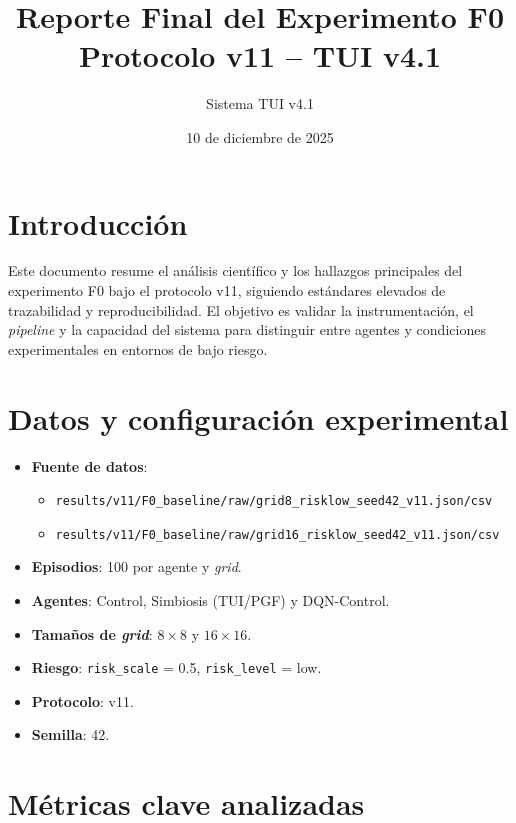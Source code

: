 \documentclass[11pt]{article}
\title{Reporte Final del Experimento F0\\[4pt]\large Protocolo v11 -- TUI v4.1}
\author{Sistema TUI v4.1}
\date{10 de diciembre de 2025}
\begin{document}
\maketitle

\section{Introducción}

Este documento resume el análisis científico y los hallazgos principales del experimento F0 bajo el protocolo v11, siguiendo estándares elevados de trazabilidad y reproducibilidad. El objetivo es validar la instrumentación, el \emph{pipeline} y la capacidad del sistema para distinguir entre agentes y condiciones experimentales en entornos de bajo riesgo.

\section{Datos y configuración experimental}

\begin{itemize}
  \item \textbf{Fuente de datos}:
    \begin{itemize}
      \item \texttt{results/v11/F0\_baseline/raw/grid8\_risklow\_seed42\_v11.json/csv}
      \item \texttt{results/v11/F0\_baseline/raw/grid16\_risklow\_seed42\_v11.json/csv}
    \end{itemize}
  \item \textbf{Episodios}: 100 por agente y \emph{grid}.
  \item \textbf{Agentes}: Control, Simbiosis (TUI/PGF) y DQN-Control.
  \item \textbf{Tamaños de \emph{grid}}: $8\times 8$ y $16\times 16$.
  \item \textbf{Riesgo}: \texttt{risk\_scale} = 0.5, \texttt{risk\_level} = low.
  \item \textbf{Protocolo}: v11.
  \item \textbf{Semilla}: 42.
\end{itemize}

\section{Métricas clave analizadas}
\end{document}
